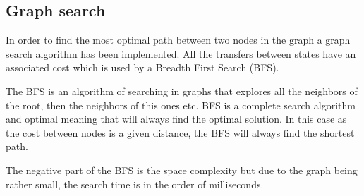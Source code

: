 	

    \subsection{Graph search} %
    \label{sub:mr_graph_search}
    In order to find the most optimal path between two nodes in the graph a graph search algorithm has been implemented.
    All the transfers between states have an associated cost which is used by a Breadth First Search (BFS).

    The BFS is an algorithm of searching in graphs that explores all the neighbors of the root, then the neighbors of this ones etc.
    BFS is a complete search algorithm and optimal meaning that will always find the optimal solution.
    In this case as the cost between nodes is a given distance, the BFS will always find the shortest path.
    
    The negative part of the BFS is the space complexity but due to the graph being rather small, the search time is in the order of milliseconds.

